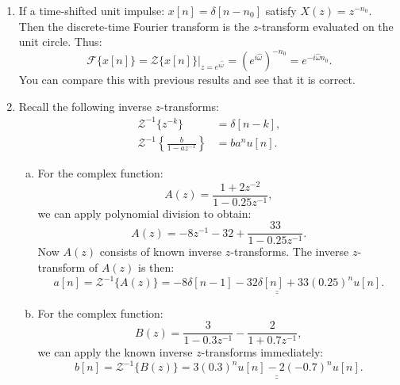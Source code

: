 \begin{enumerate}
\begin{enumerate}[a)]
          \end{enumerate}

    \item If a time-shifted unit impulse: $x[n]=\delta[n-n_0]$ satisfy $X(z)=z^{-n_{0}}$.
          Then the discrete-time Fourier transform is the $z$-transform evaluated on the unit circle. Thus:
          \[\mathcal{F}\{x[n]\}=\mathcal{Z}\{x[n]\}|_{z=e^{i\hat{\omega}}}=(e^{i\hat{\omega}})^{-n_{0}}=e^{-i\hat{\omega}n_{0}}.\]
          You can compare this with previous results and see that it is correct.

    \item Recall the following inverse $z$-transforms:
          \begin{align*}
              \mathcal{Z}^{-1}\{z^{-k}\}                         & = \delta[n-k], \\
              \mathcal{Z}^{-1}\left\{\frac{b}{1-az^{-1}}\right\} & = ba^{n}u[n].
          \end{align*}
          \begin{enumerate}[a)]
              \item For the complex function:
                    \[A(z) = \frac{1 + 2z^{-2}}{1 - 0.25z^{-1}},\]
                    we can apply polynomial division to obtain:
                    \[A(z) = -8z^{-1} - 32 + \frac{33}{1 - 0.25z^{-1}}.\]
                    Now $A(z)$ consists of known inverse $z$-transforms. The inverse $z$-transform of $A(z)$ is then:
                    \[a[n] = \mathcal{Z}^{-1}\{A(z)\}=\underline{\underline{-8\delta[n-1] - 32\delta[n] + 33(0.25)^{n}u[n]}}.\]

              \item For the complex function:
                    \[B(z) = \frac{3}{1 - 0.3z^{-1}} - \frac{2}{1 + 0.7z^{-1}},\]
                    we can apply the known inverse $z$-transforms immediately:
                    \[b[n] = \mathcal{Z}^{-1}\{B(z)\}=\underline{\underline{3(0.3)^{n}u[n] - 2(-0.7)^{n}u[n]}}.\]


\end{enumerate}
\end{enumerate}
